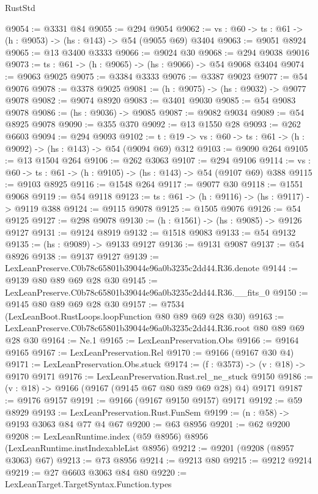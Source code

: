 \begin{lexlean}{RustStd}
\begin{coremodule}
@9054 := @3331 @84
@9055 := @294 @9054
@9062 := {vs : @60} -> {ts : @61} -> (h : @9053) -> (hs : @143) -> @54 (@9055 @69) @3404
@9063 := @9051 @8924
@9065 := @13 @3400 @3333
@9066 := @9024 @30
@9068 := @294 @9038 @9016
@9073 := {ts : @61} -> (h : @9065) -> (hs : @9066) -> @54 @9068 @3404
@9074 := @9063 @9025
@9075 := @3384 @3333
@9076 := @3387 @9023
@9077 := @54 @9076
@9078 := @3378 @9025
@9081 := (h : @9075) -> (hs : @9032) -> @9077 @9078
@9082 := @9074 @8920
@9083 := @3401 @9030
@9085 := @54 @9083 @9078
@9086 := (hs : @9036) -> @9085
@9087 := @9082 @9034
@9089 := @54 @8925 @9078
@9090 := @355 @370
@9092 := @13 @1550 @28
@9093 := @262 @6603
@9094 := @294 @9093
@9102 := {t : @19} -> {vs : @60} -> {ts : @61} -> (h : @9092) -> (hs : @143) -> @54 (@9094 @69) @312
@9103 := @9090 @264
@9105 := @13 @1504 @264
@9106 := @262 @3063
@9107 := @294 @9106
@9114 := {vs : @60} -> {ts : @61} -> (h : @9105) -> (hs : @143) -> @54 (@9107 @69) @388
@9115 := @9103 @8925
@9116 := @1548 @264
@9117 := @9077 @30
@9118 := @1551 @9068
@9119 := @54 @9118
@9123 := {ts : @61} -> (h : @9116) -> (hs : @9117) -> @9119 @388
@9124 := @9115 @9078
@9125 := @1505 @9076
@9126 := @54 @9125
@9127 := @298 @9078
@9130 := (h : @1561) -> (hs : @9085) -> @9126 @9127
@9131 := @9124 @8919
@9132 := @1518 @9083
@9133 := @54 @9132
@9135 := (hs : @9089) -> @9133 @9127
@9136 := @9131 @9087
@9137 := @54 @8926
@9138 := @9137 @9127
@9139 := LexLeanPreserve.C0b78c65801b39044e96a0b3235c2dd44.R36.denote
@9144 := @9139 @80 @89 @69 @28 @30
@9145 := LexLeanPreserve.C0b78c65801b39044e96a0b3235c2dd44.R36.__fits_0
@9150 := @9145 @80 @89 @69 @28 @30
@9157 := @7534 (LexLeanBoot.RustLoops.loopFunction @80 @89 @69 @28 @30)
@9163 := LexLeanPreserve.C0b78c65801b39044e96a0b3235c2dd44.R36.root @80 @89 @69 @28 @30
@9164 := Ne.{1}
@9165 := LexLeanPreservation.Obs
@9166 := @9164 @9165
@9167 := LexLeanPreservation.Rel
@9170 := @9166 (@9167 @30 @4)
@9171 := LexLeanPreservation.Obs.stuck
@9174 := (f : @3573) -> (v : @18) -> @9170 @9171
@9176 := LexLeanPreservation.Rust.rel_ne_stuck @9150
@9186 := (v : @18) -> @9166 (@9167 (@9145 @67 @80 @89 @69 @28) @4) @9171
@9187 := @9176 @9157
@9191 := @9166 (@9167 @9150 @9157) @9171
@9192 := @59 @8929
@9193 := LexLeanPreservation.Rust.FunSem
@9199 := (n : @58) -> @9193 @3063 @84 @77 @4 @67
@9200 := @63 @8956
@9201 := @62 @9200
@9208 := LexLeanRuntime.index (@59 @8956) @8956 (LexLeanRuntime.instIndexableList @8956)
@9212 := @9201 (@9208 (@8957 @3063) @67)
@9213 := @73 @8956
@9214 := @9213 @80
@9215 := @9212 @9214
@9219 := @27 @6603 @3063 @84 @80
@9220 := LexLeanTarget.TargetSyntax.Function.types

\end{coremodule}
\end{lexlean}
